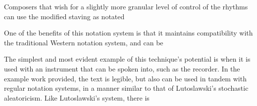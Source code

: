 Composers that wish for a slightly more granular level of control of the rhythms can use the modified staving as notated 

One of the benefits of this notation system is that it maintains compatibility with the traditional Western notation system, and can be 

The simplest and most evident example of this technique's potential is when it is used with an instrument that can be spoken into, such as the recorder. 
In the example work provided, the text is legible, but also can be used in tandem with regular notation systems, in a manner similar to that of Lutoslawski's stochastic aleatoricism. 
Like Lutoslawski's system, there is 

